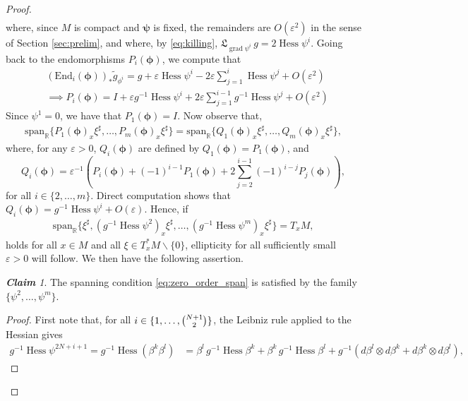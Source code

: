 \documentclass{article}
\theoremstyle{remark}
\newtheorem*{claim*}{\bf Claim}
\newcommand{\M}{M}
\DeclareMathOperator{\grad}{\mathrm{grad}}
\DeclareMathOperator{\Hess}{Hess}
\begin{document}
\begin{proof}
\begin{align*}
\end{align*}
%
where, since $\M$ is compact and $\bm{\psi}$ is fixed, the remainders are $O(\varepsilon^2)$ in the sense of Section \ref{sec:prelim}, and where, by \eqref{eq:killing}, $\mathfrak{L}_{\grad\psi^i}\,g=2\Hess\psi^i$.
%
Going back to the endomorphisms $P_i(\bm{\phi})$, we compute that
%
\begin{align*}
    &(\mathrm{End}_{i}(\bm{\phi}))_*\tilde{g}_{\phi^i} = g +  \varepsilon \Hess \psi^i - 2\varepsilon \sum_{j=1}^i \Hess\psi^j  + O(\varepsilon^2) \\
    &\implies P_i(\bm{\phi}) = I + \varepsilon g^{-1} \Hess \psi^i + 2\varepsilon \sum_{j=1}^{i-1}  g^{-1} \Hess\psi^j + O(\varepsilon^2)
\end{align*}
%
Since $\psi^1=0$, we have that $P_1(\bm{\phi}) = I$. Now observe that, 
%
\begin{align*}
    \mathrm{span}_{\mathbb{R}}\{P_1(\bm{\phi})_x\xi^\sharp,\dots,P_m(\bm{\phi})_x\xi^\sharp\} = \mathrm{span}_{\mathbb{R}}\{{Q}_1(\bm{\phi})_x\xi^\sharp,\dots,{Q}_m(\bm{\phi})_x\xi^\sharp\},
\end{align*}
%
where, for any $\varepsilon> 0$,  ${Q}_{i}(\bm{\phi})$ are defined by ${Q}_1(\bm{\phi})=P_1(\bm{\phi})$, and
%
$$
{Q}_{i}(\bm{\phi})=\varepsilon^{-1}\left(P_i(\bm{\phi})+(-1)^{i-1}P_1(\bm{\phi}) +2\sum_{j=2}^{i-1}(-1)^{i-j} P_j(\bm{\phi}) \right),
$$ 
for all $i\in\{2,\dots,m\}$. Direct computation shows that 
%
$
{Q}_i(\bm{\phi})= g^{-1}\Hess \psi^{i}+ O(\varepsilon).
$
%
Hence, if
%
\begin{align}\label{eq:zero_order_span}
    \mathrm{span}_{\mathbb{R}}\{\xi^\sharp,(g^{-1}\Hess\psi^2)_x\xi^\sharp,\dots,(g^{-1}\Hess\psi^{m})_x\xi^\sharp\}=T_x\M,
\end{align}
%
holds for all $x\in\M$ and all $\xi\in T_x^*\M\backslash\{0\}$, ellipticity for all sufficiently small $\varepsilon>0$ will follow. We then have the following assertion.
%
\begin{claim*}
    The spanning condition \eqref{eq:zero_order_span} is satisfied by the family $\{\psi^2,\dots,\psi^m\}$.
\end{claim*}
%
\begin{proof}
    First note that, for all $i\in\{1,\dots,\tbinom{N+1}{2}\}$, the Leibniz rule applied to the Hessian gives
%
\begin{align*}
    g^{-1}\Hess \psi^{2N+i+1} = g^{-1}\Hess (\beta^k\beta^l) &= \beta^l\, g^{-1}\Hess \beta^k + \beta^k\, g^{-1}\Hess \beta^l + g^{-1}(d\beta^l\otimes d\beta^k + d\beta^k\otimes d\beta^l),
\end{align*}

\end{proof}
\end{proof}
\end{document}
